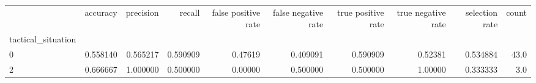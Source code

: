 \begin{tabular}{lrrrrrrrrr}
\toprule
{} &  accuracy &  precision &    recall &  false positive rate &  false negative rate &  true positive rate &  true negative rate &  selection rate &  count \\
tactical\_situation &           &            &           &                      &                      &                     &                     &                 &        \\
\midrule
0                  &  0.558140 &   0.565217 &  0.590909 &              0.47619 &             0.409091 &            0.590909 &             0.52381 &        0.534884 &   43.0 \\
2                  &  0.666667 &   1.000000 &  0.500000 &              0.00000 &             0.500000 &            0.500000 &             1.00000 &        0.333333 &    3.0 \\
\bottomrule
\end{tabular}
